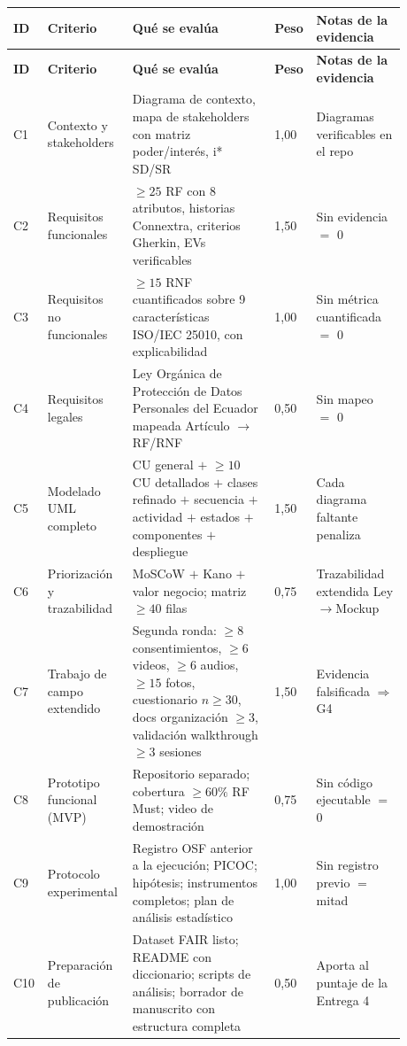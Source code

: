 \documentclass[11pt,a4paper]{article}
\newcommand{\hh}[1]{\cellcolor{uteqgreen}\textbf{\color{white}\small #1}}
\begin{document}
\begin{landscape}
\renewcommand{\arraystretch}{1.15}
\begin{longtable}{@{}p{0.05\linewidth} p{0.20\linewidth} p{0.35\linewidth} p{0.06\linewidth} p{0.22\linewidth}@{}}
    \hh{ID} & \hh{Criterio} & \hh{Qué se evalúa} & \hh{Peso} & \hh{Notas de la evidencia}\\
    \endfirsthead
    \hh{ID} & \hh{Criterio} & \hh{Qué se evalúa} & \hh{Peso} & \hh{Notas de la evidencia}\\
    \endhead
    C1 & Contexto y stakeholders & Diagrama de contexto, mapa de stakeholders con matriz poder/interés, i* SD/SR & 1,00 & Diagramas verificables en el repo\\
    C2 & Requisitos funcionales & $\geq 25$ RF con 8 atributos, historias Connextra, criterios Gherkin, EVs verificables & 1,50 & Sin evidencia $=$ 0\\
    C3 & Requisitos no funcionales & $\geq 15$ RNF cuantificados sobre 9 características ISO/IEC 25010, con explicabilidad & 1,00 & Sin métrica cuantificada $=$ 0\\
    C4 & Requisitos legales & Ley Orgánica de Protección de Datos Personales del Ecuador mapeada Artículo $\rightarrow$ RF/RNF & 0,50 & Sin mapeo $=$ 0\\
    C5 & Modelado UML completo & CU general $+$ $\geq 10$ CU detallados $+$ clases refinado $+$ secuencia $+$ actividad $+$ estados $+$ componentes $+$ despliegue & 1,50 & Cada diagrama faltante penaliza\\
    C6 & Priorización y trazabilidad & MoSCoW $+$ Kano $+$ valor negocio; matriz $\geq 40$ filas & 0,75 & Trazabilidad extendida Ley$\rightarrow$Mockup\\
    C7 & Trabajo de campo extendido & Segunda ronda: $\geq 8$ consentimientos, $\geq 6$ videos, $\geq 6$ audios, $\geq 15$ fotos, cuestionario $n \geq 30$, docs organización $\geq 3$, validación walkthrough $\geq 3$ sesiones & 1,50 & Evidencia falsificada $\Rightarrow$ G4\\
    C8 & Prototipo funcional (MVP) & Repositorio separado; cobertura $\geq 60\%$ RF Must; video de demostración & 0,75 & Sin código ejecutable $=$ 0\\
    C9 & Protocolo experimental & Registro OSF anterior a la ejecución; PICOC; hipótesis; instrumentos completos; plan de análisis estadístico & 1,00 & Sin registro previo $=$ mitad\\
    C10 & Preparación de publicación & Dataset FAIR listo; README con diccionario; scripts de análisis; borrador de manuscrito con estructura completa & 0,50 & Aporta al puntaje de la Entrega 4\\
\end{longtable}
\end{landscape}
\end{document}
